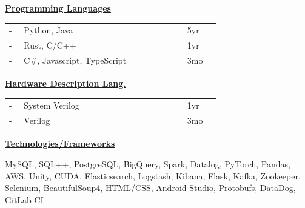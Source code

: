 \documentclass{resume}
\begin{document}
\setlength{\topskip}{0pt}
\noindent{}%
{%
    \hspace{0.02\textwidth}
    \begin{minipage}[t][\textheight-2\fboxsep-2\fboxrule][t]{0.25\textwidth}
        \color{white}
        \vspace{12px}
        \vspace{12px}
        \vspace{12px}

        \begin{itemize}[align=center]
        \end{itemize}
        \vspace{12px}

        \textbf{\underline{Programming Languages}}
        \begin{tabular}{p{0.04\linewidth}>{\raggedright}p{0.55\linewidth}p{0.1\linewidth}}
            - & Python, Java                & 5yr \\
            - & Rust, C/C++                 & 1yr \\
            - & C\#, Javascript, TypeScript & 3mo \\
        \end{tabular}
        \vspace{12px}

        \noindent\textbf{\underline{Hardware Description Lang.}}
        \begin{tabular}{p{0.04\linewidth}>{\raggedright}p{0.55\linewidth}p{0.1\linewidth}}
            - & System Verilog & 1yr \\
            - & Verilog        & 3mo \\
        \end{tabular}
        \vspace{12px}

        \textbf{\underline{Technologies/Frameworks}}
        \raggedright MySQL, SQL++, PostgreSQL, BigQuery,
        Spark, Datalog, PyTorch,
        Pandas, AWS, Unity, CUDA,
        Elasticsearch, Logstash,
        Kibana, Flask, Kafka,
        Zookeeper, Selenium,
        BeautifulSoup4, HTML/CSS,
        Android Studio, Protobufs,
        DataDog, GitLab CI
        \vspace{12px}


\end{minipage}}
\end{document}
